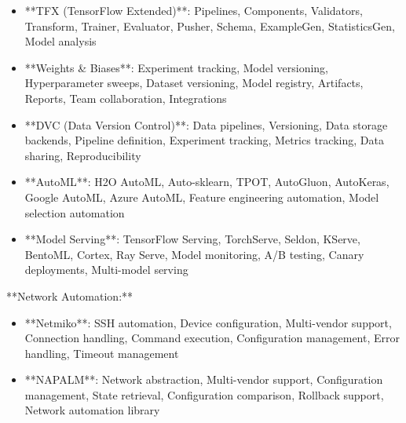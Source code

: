 \documentclass[11pt,a4paper]{article}
\begin{document}
\begin{itemize}
\item **TFX (TensorFlow Extended)**: Pipelines, Components, Validators, Transform, Trainer, Evaluator, Pusher, Schema, ExampleGen, StatisticsGen, Model analysis
\end{itemize}

\begin{itemize}
\item **Weights & Biases**: Experiment tracking, Model versioning, Hyperparameter sweeps, Dataset versioning, Model registry, Artifacts, Reports, Team collaboration, Integrations
\end{itemize}

\begin{itemize}
\item **DVC (Data Version Control)**: Data pipelines, Versioning, Data storage backends, Pipeline definition, Experiment tracking, Metrics tracking, Data sharing, Reproducibility
\end{itemize}

\begin{itemize}
\item **AutoML**: H2O AutoML, Auto-sklearn, TPOT, AutoGluon, AutoKeras, Google AutoML, Azure AutoML, Feature engineering automation, Model selection automation
\end{itemize}

\begin{itemize}
\item **Model Serving**: TensorFlow Serving, TorchServe, Seldon, KServe, BentoML, Cortex, Ray Serve, Model monitoring, A/B testing, Canary deployments, Multi-model serving
\end{itemize}

**Network Automation:**

\begin{itemize}
\item **Netmiko**: SSH automation, Device configuration, Multi-vendor support, Connection handling, Command execution, Configuration management, Error handling, Timeout management
\end{itemize}

\begin{itemize}
\item **NAPALM**: Network abstraction, Multi-vendor support, Configuration management, State retrieval, Configuration comparison, Rollback support, Network automation library
\end{itemize}
\end{document}

